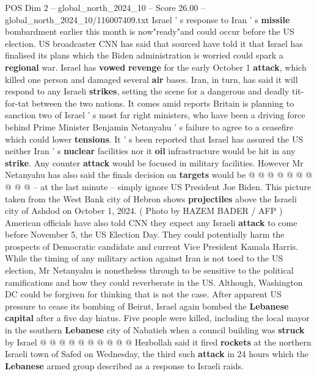 \begin{textsample}{POS Dim 2 – global\_north\_2024\_10 – Score 26.00 – global\_north\_2024\_10/116007409.txt}  \label{ex:f2_pos_078}
Israel ' s response to Iran ' s \textbf{missile} bombardment earlier this month is now"ready"and could occur before the US election.
US broadcaster CNN has said that sourced have told it that Israel has finalised its plans which the Biden administration is worried could spark a \textbf{regional} war.
Israel has \textbf{vowed} \textbf{revenge} for the early October 1 \textbf{attack}, which killed one person and damaged several \textbf{air} bases.
Iran, in turn, has said it will respond to any Israeli \textbf{strikes}, setting the scene for a dangerous and deadly tit-for-tat between the two nations.
It comes amid reports Britain is planning to sanction two of Israel ' s most far right ministers, who have been a driving force behind Prime Minister Benjamin Netanyahu ' s failure to agree to a ceasefire which could lower \textbf{tensions}.
It ' s been reported that Israel has assured the US neither Iran ' s \textbf{nuclear} facilities nor it \textbf{oil} infrastructure would be hit in any \textbf{strike}.
Any counter \textbf{attack} would be focused in military facilities.
However Mr Netanyahu has also said the finals decision on \textbf{targets} would be @ @ @ @ @ @ @ @ @ @ -- at the last minute -- simply ignore US President Joe Biden.
This picture taken from the West Bank city of Hebron shows \textbf{projectiles} above the Israeli city of Ashdod on October 1, 2024. ( Photo by HAZEM BADER / AFP ) American officials have also told CNN they expect any Israeli \textbf{attack} to come before November 5, the US Election Day.
They could potentially harm the prospects of Democratic candidate and current Vice President Kamala Harris.
While the timing of any military action against Iran is not toed to the US election, Mr Netanyahu is nonetheless through to be sensitive to the political ramifications and how they could reverberate in the US.
Although, Washington DC could be forgiven for thinking that is not the case.
After apparent US pressure to cease its bombing of Beirut, Israel again bombed the \textbf{Lebanese} \textbf{capital} after a five day hiatus.
Five people were killed, including the local mayor in the southern \textbf{Lebanese} city of Nabatieh when a council building was \textbf{struck} by Israel @ @ @ @ @ @ @ @ @ @ Hezbollah said it fired \textbf{rockets} at the northern Israeli town of Safed on Wednesday, the third such \textbf{attack} in 24 hours which the \textbf{Lebanese} armed group described as a response to Israeli raids.

\end{textsample}

